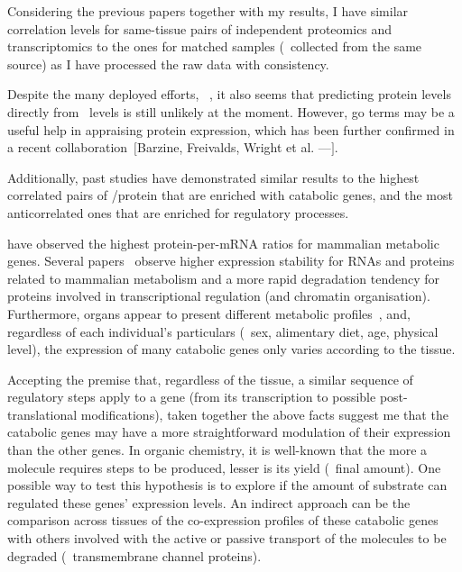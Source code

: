 Considering the previous papers together with my results,
I have similar correlation levels for same-tissue pairs of
independent proteomics and transcriptomics
to the ones for matched samples (\ie\ collected from the same source)
as I have processed the raw data with consistency.\mybr\

Despite the many deployed efforts,
\eg\ \citet{Franks2017-bp,Eraslan2019-md},
it also seems that predicting protein levels directly from \mRNA\ levels
is still unlikely at the moment.
However, \gls{go} terms may be a useful help in appraising protein expression,
which has been further confirmed in a recent collaboration~$\lbrack$Barzine,
Freivalds, Wright et al. ---\cite{deepLearning2020}$\rbrack$.\mybr\

Additionally, past studies have demonstrated similar results to
the highest correlated pairs of \mRNA/protein
that are enriched with catabolic genes,
and the most anticorrelated ones that are enriched for regulatory processes.\mybr\

\citet{Vogel2010-ux} have observed the highest protein-per-mRNA ratios
for mammalian metabolic genes.
Several papers~
observe higher expression stability for
\glspl{RNA} and proteins related to mammalian metabolism
and a more rapid degradation tendency
for proteins involved in transcriptional regulation (and chromatin organisation).
Furthermore, organs appear to present
different metabolic profiles~,
and, regardless of each individual's particulars
(\eg\ sex, alimentary diet, age, physical level),
the expression of many catabolic genes only varies according to the tissue.\mybr\

Accepting the premise that,
regardless of the tissue,
a similar sequence of regulatory steps apply to a gene
(from its transcription to possible post-translational modifications),
taken together the above facts suggest me that
the catabolic genes may have
a more straightforward modulation of their expression than the other genes.
In organic chemistry,
it is well-known that the more a molecule requires steps to be produced,
lesser is its yield (\ie\ final amount).
One possible way to test this hypothesis is to explore if
the amount of substrate can regulated these genes' expression levels.
An indirect approach can be
the comparison across tissues of the co-expression profiles of these catabolic genes
with others involved with the active or passive transport of the molecules
to be degraded (\eg\ transmembrane channel proteins).\mybr\

